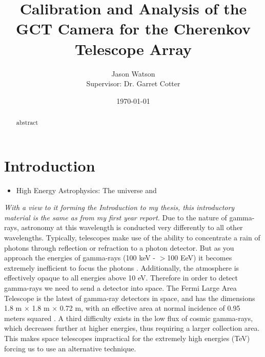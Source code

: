 \documentclass[%
amsmath,amssymb,
onecolumn,
a4paper,
10pt
]{article}%
\begin{document}
	
	\title{Calibration and Analysis of the GCT Camera for the Cherenkov Telescope Array}
	\author{Jason Watson\\\small Supervisor: Dr. Garret Cotter}
	\date{\today}
	
	\maketitle
	
	\begin{abstract}
		abstract
	\end{abstract}
	
	\tableofcontents
	
	\clearpage
	
	\section{Introduction}
		\begin{itemize}
			\item High Energy Astrophysics: The universe and 
		\end{itemize}
	
		\textit{With a view to it forming the Introduction to my thesis, this introductory material is the same as from my first year report.}
		Due to the nature of gamma-rays, astronomy at this wavelength is conducted very differently to all other wavelengths. Typically, telescopes make use of the ability to concentrate a rain of photons through reflection or refraction to a photon detector. But as you approach the energies of gamma-rays (100 keV - $>$100 EeV) it becomes extremely inefficient to focus the photons \citep[p.~6]{weekes2003}. Additionally, the atmosphere is effectively opaque to all energies above 10 eV. Therefore in order to detect gamma-rays we need to send a detector into space. The Fermi Large Area Telescope is the latest of gamma-ray detectors in space, and has the dimensions 1.8 m × 1.8 m × 0.72 m, with an effective area at normal incidence of 0.95 meters squared \citep{Atwood2009}. A third difficulty exists in the low flux of cosmic gamma-rays, which decreases further at higher energies, thus requiring a larger collection area. This makes space telescopes impractical for the extremely high energies (TeV) forcing us to use an alternative technique.
		
\end{document}
